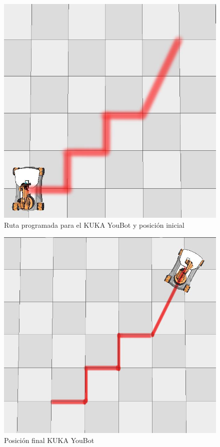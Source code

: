 \documentclass[conference]{IEEEtran}
\begin{document}
\begin{figure}
  \includegraphics[width=\linewidth]{figures/kuka_init_pos.jpg}
  \caption{Ruta programada para el KUKA YouBot y posición inicial}
  \label{fig:kukaroute}
\end{figure}

\begin{figure}
  \includegraphics[width=\linewidth]{figures/kuka_final_pos.jpg}
  \caption{Posición final KUKA YouBot}
  \label{fig:kukafinal}
\end{figure}
\end{document}
